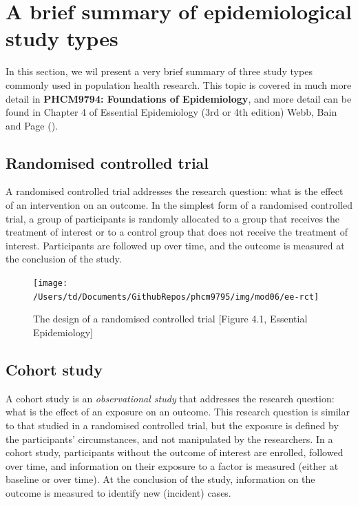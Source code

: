 \documentclass[
]{memoir}
\begin{document}
\hypertarget{a-brief-summary-of-epidemiological-study-types}{%
\section{A brief summary of epidemiological study types}\label{a-brief-summary-of-epidemiological-study-types}}

In this section, we wil present a very brief summary of three study types commonly used in population health research. This topic is covered in much more detail in \textbf{PHCM9794: Foundations of Epidemiology}, and more detail can be found in Chapter 4 of Essential Epidemiology (3rd or 4th edition) Webb, Bain and Page (\citet{webb_etal16}).

\hypertarget{randomised-controlled-trial}{%
\subsection{Randomised controlled trial}\label{randomised-controlled-trial}}

A randomised controlled trial addresses the research question: what is the effect of an intervention on an outcome. In the simplest form of a randomised controlled trial, a group of participants is randomly allocated to a group that receives the treatment of interest or to a control group that does not receive the treatment of interest. Participants are followed up over time, and the outcome is measured at the conclusion of the study.

\begin{figure}[H]
\texttt{[image: /Users/td/Documents/GithubRepos/phcm9795/img/mod06/ee-rct]} \caption{The design of a randomised controlled trial [Figure 4.1, Essential Epidemiology]}\label{fig:ee-fig-rct}
\end{figure}

\hypertarget{cohort-study}{%
\subsection{Cohort study}\label{cohort-study}}

A cohort study is an \emph{observational study} that addresses the research question: what is the effect of an exposure on an outcome. This research question is similar to that studied in a randomised controlled trial, but the exposure is defined by the participants' circumstances, and not manipulated by the researchers. In a cohort study, participants without the outcome of interest are enrolled, followed over time, and information on their exposure to a factor is measured (either at baseline or over time). At the conclusion of the study, information on the outcome is measured to identify new (incident) cases.
\end{document}
